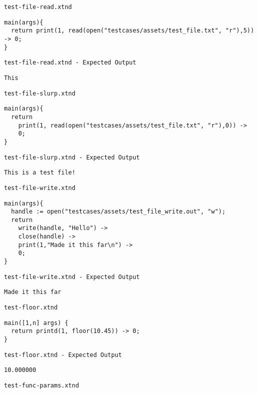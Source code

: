 \medskip \noindent \texttt{test-file-read.xtnd}


\begin{lstlisting}
main(args){
  return print(1, read(open("testcases/assets/test_file.txt", "r"),5)) -> 0;
}
\end{lstlisting}


\medskip \noindent \texttt{test-file-read.xtnd - Expected Output}


\begin{lstlisting}
This \end{lstlisting}


\medskip \noindent \texttt{test-file-slurp.xtnd}


\begin{lstlisting}
main(args){
  return
    print(1, read(open("testcases/assets/test_file.txt", "r"),0)) ->
    0;
}
\end{lstlisting}


\medskip \noindent \texttt{test-file-slurp.xtnd - Expected Output}


\begin{lstlisting}
This is a test file!
\end{lstlisting}


\medskip \noindent \texttt{test-file-write.xtnd}


\begin{lstlisting}
main(args){
  handle := open("testcases/assets/test_file_write.out", "w");
  return
    write(handle, "Hello") ->
    close(handle) ->
    print(1,"Made it this far\n") ->
    0;
}
\end{lstlisting}


\medskip \noindent \texttt{test-file-write.xtnd - Expected Output}


\begin{lstlisting}
Made it this far
\end{lstlisting}


\medskip \noindent \texttt{test-floor.xtnd}


\begin{lstlisting}
main([1,n] args) {
  return printd(1, floor(10.45)) -> 0;
}
\end{lstlisting}


\medskip \noindent \texttt{test-floor.xtnd - Expected Output}


\begin{lstlisting}
10.000000
\end{lstlisting}


\medskip \noindent \texttt{test-func-params.xtnd}


